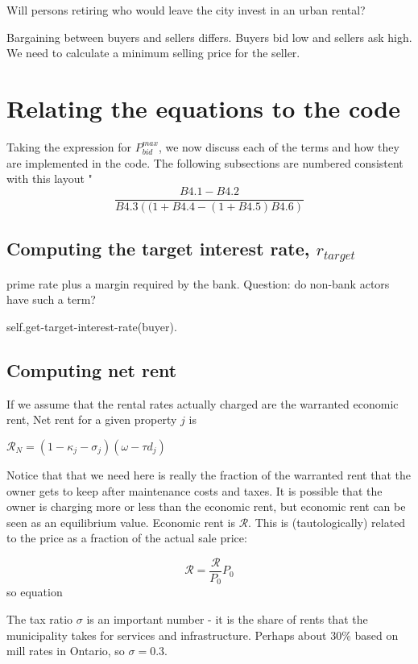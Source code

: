 Will persons retiring who would leave the city invest in an urban rental?

Bargaining between buyers and sellers differs. Buyers bid low and sellers ask high.  {\color{red}We need to calculate a minimum selling price for the seller}.



\section{Relating the equations to the code}
Taking the expression for $P^{max}_{bid}$, we now discuss each of the terms and how they are implemented in the code. The following subsections are numbered consistent with this layout "
\[\frac{B4.1-B4.2}{B4.3\left( (1+B4.4 - (1+B4.5)B4.6\right)}\]

\subsection{Computing the target interest rate, $r_{target}$}
prime rate plus a margin required by the bank.  Question: do non-bank actors have such a term?

self.get-target-interest-rate(buyer).


\subsection{Computing net rent}
If we assume that the rental rates actually charged are the warranted economic rent, Net rent for a given property $j$ is

$\mathcal{R}_N = (1-\kappa_j - \sigma_j) (\omega - \tau d_j)$

{\color{red}
Notice that that we need here is really the fraction of the warranted rent that the owner gets to keep after maintenance costs and taxes. It is possible that the owner is charging more or less than the economic  rent, but economic rent can be seen as an equilibrium value. Economic rent is $\mathcal{R}$.  This is (tautologically) related to the price as a fraction of the actual sale price:

\[\mathcal{R}= \frac{\mathcal{R}}{P_0}P_0 \]
so equation

}

The tax ratio $\sigma$ is an important number - it is the share of rents that the municipality takes for services and infrastructure. Perhaps about 30\% based on mill rates in Ontario,  so $\sigma = 0.3$. %

